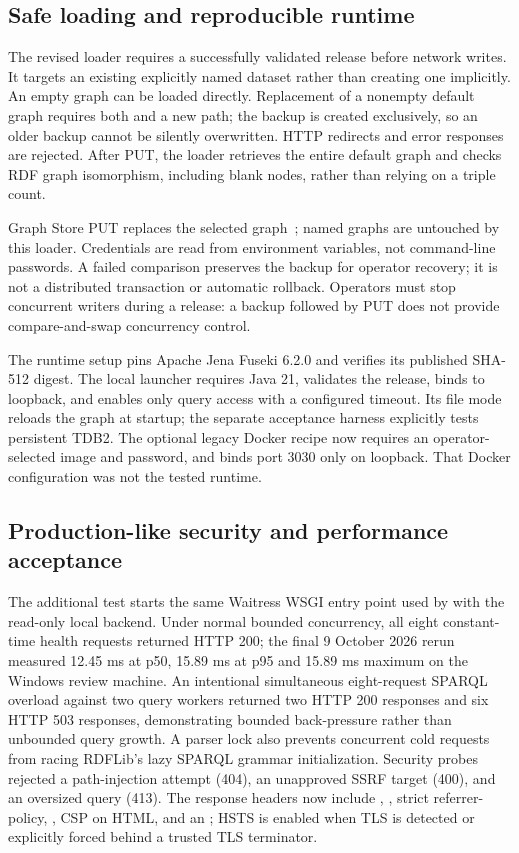 \subsection{Safe loading and reproducible runtime}
The revised loader requires a successfully validated release before network writes.
It targets an existing explicitly named dataset rather than creating one implicitly.
An empty graph can be loaded directly. Replacement of a nonempty default graph requires
both  and a new  path; the backup is created exclusively,
so an older backup cannot be silently overwritten. HTTP redirects and error responses are
rejected. After PUT, the loader retrieves the entire default graph and checks RDF graph
isomorphism, including blank nodes, rather than relying on a triple count.

Graph Store PUT replaces the selected graph~\cite{gsp}; named graphs are untouched by
this loader. Credentials are read from environment variables, not command-line passwords.
A failed comparison preserves the backup for operator recovery; it is not a distributed
transaction or automatic rollback. Operators must stop concurrent writers during a release:
a backup followed by PUT does not provide compare-and-swap concurrency control.

The runtime setup pins Apache Jena Fuseki 6.2.0 and verifies its published SHA-512 digest.
The local launcher requires Java 21, validates the release, binds to loopback, and enables
only query access with a configured timeout. Its file mode reloads the graph at startup;
the separate acceptance harness explicitly tests persistent TDB2.
The optional legacy Docker recipe now requires an operator-selected image and password,
and binds port 3030 only on loopback. That Docker configuration was not the tested runtime.

\subsection{Production-like security and performance acceptance}
The additional  test starts the same Waitress WSGI
entry point used by  with the read-only local backend. Under
normal bounded concurrency, all eight constant-time health requests returned HTTP 200; the
final 9 October 2026 rerun measured 12.45 ms at p50, 15.89 ms at p95 and 15.89 ms maximum
on the Windows review machine. An intentional simultaneous eight-request SPARQL overload
against two query workers returned two HTTP 200 responses and six HTTP 503 responses,
demonstrating bounded back-pressure rather than unbounded query growth. A parser lock also
prevents concurrent cold requests from racing RDFLib's lazy SPARQL grammar initialization.
Security probes rejected a path-injection
attempt (404), an unapproved SSRF  target (400), and an oversized query (413).
The response headers now include , , strict referrer-policy,
, CSP on HTML, and an ; HSTS is enabled when
TLS is detected or explicitly forced behind a trusted TLS terminator.

